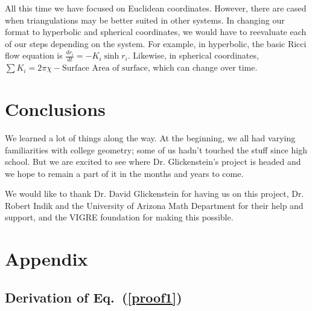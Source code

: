 \documentclass[12pt]{article}
\begin{document}
All this time we have focused on Euclidean coordinates. However, there are cased when triangulations may be better suited in other systems. In changing our format to hyperbolic and spherical coordinates, we would have to reevaluate each of our steps depending on the system. For example, in hyperbolic, the basic Ricci flow equation is $\displaystyle \frac{dr_i}{dt} = -K_i\sinh r_i$. Likewise, in spherical coordinates, $\displaystyle \sum{K_i} = 2\pi\chi - \mbox{Surface Area of surface}$, which can change over time. 

\section{Conclusions}
  We learned a lot of things along the way. At the beginning, we all had varying familiarities with college geometry; some of us hadn't touched the stuff since high school. But we are excited to see where Dr. Glickenstein's project is headed and we hope to remain a part of it in the months and years to come.\newline
  
  \noindent We would like to thank Dr. David Glickenstein for having us on this project, Dr. Robert Indik and the University of Arizona Math Department for their help and support, and the VIGRE foundation for making this possible. 
  
\newpage
  


\newpage
\section*{Appendix}

\subsection*{Derivation of Eq.~(\ref{proof1})}
\maketitle
	
\end{document}
